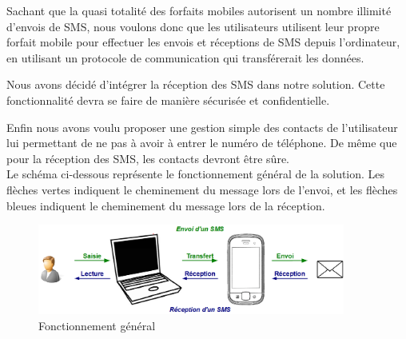 Sachant que la quasi totalité des forfaits mobiles autorisent un nombre illimité d'envois de SMS, nous voulons donc que les utilisateurs utilisent leur propre forfait mobile pour effectuer les envois et réceptions de SMS depuis l'ordinateur, en utilisant un protocole de communication qui transférerait les données.

Nous avons décidé d'intégrer la réception des SMS dans notre solution.
Cette fonctionnalité devra se faire de manière sécurisée et confidentielle.

Enfin nous avons voulu proposer une gestion simple des contacts de l'utilisateur lui permettant de ne pas à avoir à entrer le numéro de téléphone.
De même que pour la réception des SMS, les contacts devront être sûre.
\\


Le schéma ci-dessous représente le fonctionnement général de la solution.
Les flèches vertes indiquent le cheminement du message lors de l'envoi, et les flèches bleues indiquent le cheminement du message lors de la réception.

\begin{figure}[!h]
	\center
	\includegraphics[width=0.9\textwidth]{img/schemaFonctionnement_general.png}
	\caption{Fonctionnement général}
	\label{schemaFonctionnement_general}
\end{figure}
